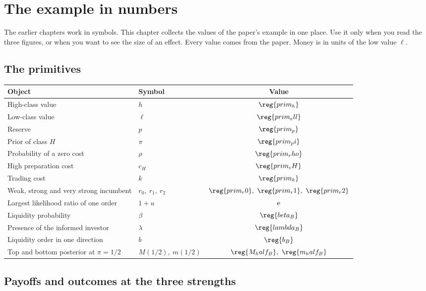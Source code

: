 \chapter{The example in numbers}\label{app:numbers}

The earlier chapters work in symbols. This chapter collects the values of the paper's example in one place.
Use it only when you read the three figures, or when you want to see the size of an effect.
Every value comes from the paper. Money is in units of the low value \(\ell\).

\section{The primitives}

\begin{center}
\begin{tabular}{@{}llc@{}}
\toprule
Object & Symbol & Value\\
\midrule
High-class value & \(h\) & \(\reg{prim_h}\)\\
Low-class value & \(\ell\) & \(\reg{prim_ell}\)\\
Reserve & \(p\) & \(\reg{prim_p}\)\\
Prior of class \(H\) & \(\pi\) & \(\reg{prim_pi}\)\\
Probability of a zero cost & \(\rho\) & \(\reg{prim_rho}\)\\
High preparation cost & \(c_H\) & \(\reg{prim_cH}\)\\
Trading cost & \(k\) & \(\reg{prim_k}\)\\
Weak, strong and very strong incumbent & \(r_0,\ r_1,\ r_2\) & \(\reg{prim_r0},\ \reg{prim_r1},\ \reg{prim_r2}\)\\
\midrule
Largest likelihood ratio of one order & \(1+u\) & \(\mathrm{e}\)\\
Liquidity probability & \(\beta\) & \(\reg{beta_B}\)\\
Presence of the informed investor & \(\lambda\) & \(\reg{lambda_B}\)\\
Liquidity order in one direction & \(b\) & \(\reg{b_B}\)\\
Top and bottom posterior at \(\pi=1/2\) & \(M(1/2),\ m(1/2)\) & \(\reg{M_half_B},\ \reg{m_half_B}\)\\
\bottomrule
\end{tabular}
\end{center}

\section{Payoffs and outcomes at the three strengths}


